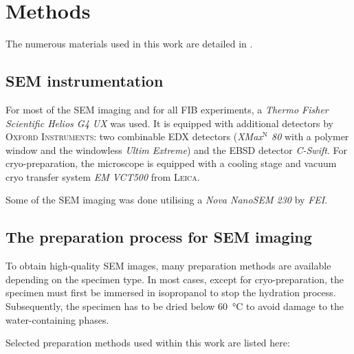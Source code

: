 \chapter{Methods}
\label{sec:methods}

The numerous materials used in this work are detailed in .
 
\section{\acs*{SEM} instrumentation}
\label{sec:sem}

For most of the \ac{SEM} imaging and for all \ac{FIB} experiments, a \textit{Thermo Fisher Scientific Helios G4 UX} was used.
It is equipped with additional detectors by \textsc{Oxford Instruments}: two combinable \ac{EDX} detectors (\textit{XMax$^\text{N}$ 80} with a polymer window and the windowless \textit{Ultim Extreme}) and the \ac{EBSD} detector \textit{C-Swift}.
For cryo-preparation, the microscope is equipped with a cooling stage and vacuum cryo transfer system \textit{EM VCT500} from \textsc{Leica}.

Some of the \ac{SEM} imaging was done utilising a \textit{Nova NanoSEM 230} by \textit{FEI}.


\section{The preparation process for \acs*{SEM} imaging}

To obtain high-quality \ac{SEM} images, many preparation methods are available depending on the specimen type.
In most cases, except for cryo-preparation, the specimen must first be immersed in isopropanol to stop the hydration process.
Subsequently, the specimen has to be dried below \qty{60}{\celsius} to avoid damage to the water-containing phases.

Selected preparation methods used within this work are listed here:

